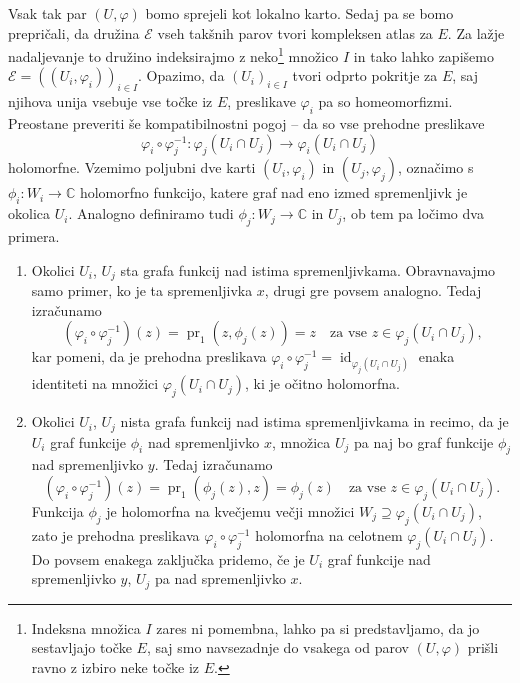 \documentclass[mat1]{fmfdelo}
\numberwithin{equation}{section}
\newcommand{\C}{\mathbb C}
\newcommand{\inv}{^{-1}}
\DeclareMathOperator{\id}{id}
\DeclareMathOperator{\pr}{pr}
\theoremstyle{definition}
\begin{document}
Vsak tak par $(U, \varphi)$ bomo sprejeli kot lokalno karto. 
Sedaj pa se bomo prepričali, da družina $\mathcal{E}$ vseh takšnih parov tvori kompleksen atlas za $E$. Za lažje nadaljevanje to družino indeksirajmo z neko\footnote{Indeksna množica $I$ zares ni pomembna, lahko pa si predstavljamo, da jo sestavljajo točke $E$, saj smo navsezadnje do vsakega od parov $(U, \varphi)$ prišli ravno z izbiro neke točke iz $E$. } množico $I$ in tako lahko zapišemo $\mathcal{E} = ((U_i, \varphi_i))_{i \in I}$. 
Opazimo, da  
$(U_i)_{i \in I}$ tvori odprto pokritje za $E$, saj njihova unija vsebuje vse točke iz $E$, preslikave $\varphi_i$ pa so homeomorfizmi. Preostane preveriti še kompatibilnostni pogoj -- da so vse prehodne preslikave
\[
    \varphi_i \circ \varphi_j\inv : \varphi_j(U_i \cap U_j) \to \varphi_i(U_i \cap U_j)  
\]
holomorfne. Vzemimo poljubni dve karti $(U_i, \varphi_i)$ in $(U_j, \varphi_j)$, označimo s $\phi_i : W_i \to \C$ holomorfno funkcijo, katere graf nad eno izmed spremenljivk je okolica $U_i$. Analogno definiramo tudi $\phi_j : W_j \to \C$ in $U_j$, ob tem pa ločimo dva primera. 
\begin{enumerate}
    \item Okolici $U_i$, $U_j$ sta grafa funkcij nad istima spremenljivkama. Obravnavajmo samo primer, ko je ta spremenljivka $x$, drugi gre povsem analogno. Tedaj izračunamo
    \[
        (\varphi_i \circ \varphi_j\inv)(z) = \pr_1(z, \phi_j(z)) = z \quad \text{za vse $z \in \varphi_j(U_i \cap U_j)$,}
    \] 
    kar pomeni, da je prehodna preslikava $\varphi_i \circ \varphi_j\inv = \id_{\varphi_j(U_i \cap U_j)}$ enaka identiteti na množici $\varphi_j(U_i \cap U_j)$, ki je očitno holomorfna. 

    \item Okolici $U_i$, $U_j$ nista grafa funkcij nad istima spremenljivkama in recimo, da je $U_i$ graf funkcije $\phi_i$ nad spremenljivko $x$, množica $U_j$ pa naj bo graf funkcije $\phi_j$ nad spremenljivko $y$. Tedaj izračunamo
    \[
        (\varphi_i \circ \varphi_j\inv)(z) = \pr_1(\phi_j(z), z) = \phi_j(z) \quad \text{za vse $z \in \varphi_j(U_i \cap U_j)$.}   
    \]
    Funkcija $\phi_j$ je holomorfna na kvečjemu večji množici $W_j \supseteq \varphi_j(U_i \cap U_j)$, zato je prehodna preslikava $\varphi_i \circ \varphi_j\inv$ holomorfna na celotnem $\varphi_j(U_i \cap U_j)$. Do povsem enakega zaključka pridemo, če je $U_i$ graf funkcije nad spremenljivko $y$, $U_j$ pa nad spremenljivko $x$. 
\end{enumerate} 
\end{document}
